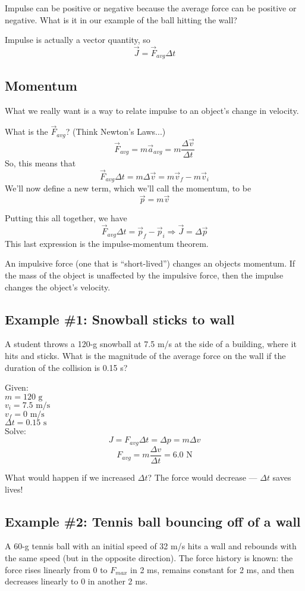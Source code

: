 Impulse can be positive or negative because the average force can be positive or negative. What is it in our example of the ball hitting the wall?

Impulse is actually a vector quantity, so 
$$\boxed{\vec{J}=\vec{F}_{avg}\Delta{t}}$$

\subsection{Momentum}
What we really want is a way to relate impulse to an object's change in velocity.

What is the $\vec{F}_{avg}$? (Think Newton's Laws...)
$$\vec{F}_{avg}=m\vec{a}_{avg}=m\frac{\Delta{\vec{v}}}{\Delta{t}}$$
So, this means that
$$\vec{F}_{avg}\Delta{t}=m\Delta{\vec{v}}=m\vec{v}_f-m\vec{v}_i$$
We'll now define a new term, which we'll call the momentum, to be 
$$\boxed{\vec{p}=m\vec{v}}$$

Putting this all together, we have
$$\vec{F}_{avg}\Delta{t}=\vec{p}_f-\vec{p}_i\Rightarrow \boxed{\vec{J}=\Delta{\vec{p}}}$$
This last expression is the impulse-momentum theorem.

An impulsive force (one that is ``short-lived'') changes an objects momentum. If the mass of the object is unaffected by the impulsive force, then the impulse changes the object's velocity.

\subsection{Example \#1: Snowball sticks to wall}
A student throws a 120-g snowball at 7.5 m/s at the side of a building, where it hits and sticks. What is the magnitude of the average force on the wall if the duration of the collision is 0.15 s?

Given:\\
$m=120\mbox{ g}$\\
$v_i=7.5\mbox{ m/s}$\\
$v_f=0\mbox{ m/s}$\\
$\Delta{t}=0.15\mbox{ s}$\\

Solve:
$$J=F_{avg}\Delta{t}=\Delta{p}=m\Delta{v}$$
$$F_{avg}=m\frac{\Delta{v}}{\Delta{t}}=6.0\mbox{ N}$$

What would happen if we increased $\Delta{t}$? The force would decrease --- $\Delta{t}$ saves lives!

\subsection{Example \#2: Tennis ball bouncing off of a wall}
A 60-g tennis ball with an initial speed of 32 m/s hits a wall and rebounds with the same speed (but in the opposite direction). The force history is known: the force rises linearly from 0 to $F_{max}$ in 2 ms, remains constant for 2 ms, and then decreases linearly to 0 in another 2 ms.

